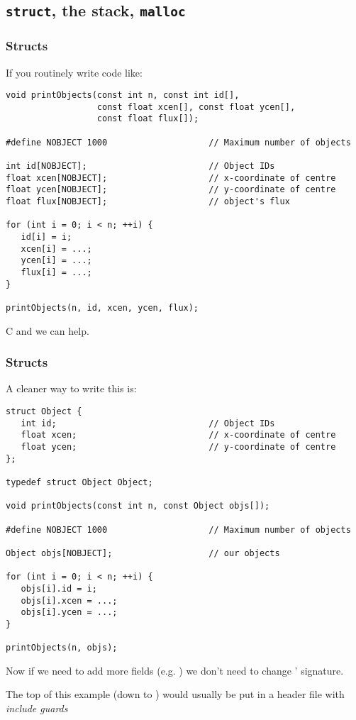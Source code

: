 \documentclass[10pt, t]{beamer}
\begin{document}
\subsection{\texttt{struct}, the stack, \texttt{malloc}}
\label{sec-5_1}
\begin{frame}[fragile]
\frametitle{Structs}
\label{sec-5_1_1}

If you routinely write code like:
\begin{verbatim}
void printObjects(const int n, const int id[],
                  const float xcen[], const float ycen[],
                  const float flux[]);

#define NOBJECT 1000                    // Maximum number of objects

int id[NOBJECT];                        // Object IDs
float xcen[NOBJECT];                    // x-coordinate of centre
float ycen[NOBJECT];                    // y-coordinate of centre
float flux[NOBJECT];                    // object's flux
  
for (int i = 0; i < n; ++i) {
   id[i] = i;
   xcen[i] = ...;
   ycen[i] = ...;
   flux[i] = ...;
}

printObjects(n, id, xcen, ycen, flux);
\end{verbatim}
C and we can help.
\end{frame}
\begin{frame}[fragile]
\frametitle{Structs}
\label{sec-5_1_2}

A cleaner way to write this is:
\begin{verbatim}
struct Object {
   int id;                              // Object IDs
   float xcen;                          // x-coordinate of centre
   float ycen;                          // y-coordinate of centre
};

typedef struct Object Object;

void printObjects(const int n, const Object objs[]);

#define NOBJECT 1000                    // Maximum number of objects

Object objs[NOBJECT];                   // our objects

for (int i = 0; i < n; ++i) {
   objs[i].id = i;
   objs[i].xcen = ...;
   objs[i].ycen = ...;
}

printObjects(n, objs);
\end{verbatim}
Now if we need to add more fields (e.g. ) we don't need to 
change ' signature.

\pause
The top of this example (down to ) would usually be put in a 
header file with \emph{include guards}
\end{frame}
\end{document}
